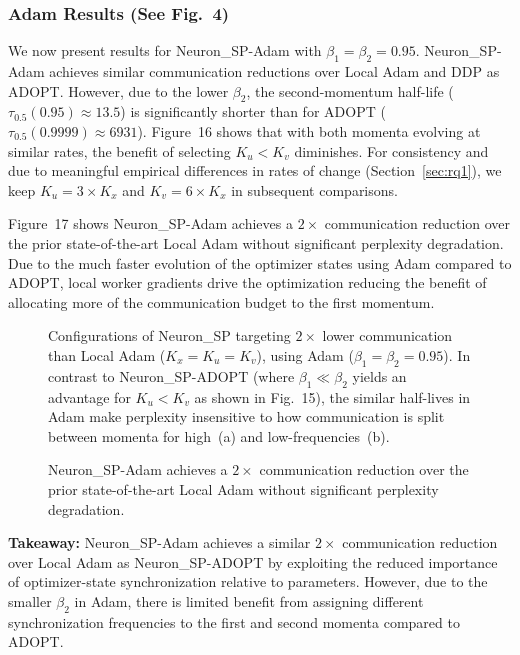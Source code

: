 \documentclass{article}
\begin{document}
\subsubsection{Adam Results (See Fig.~4)}
\label{sec:b34_adam_fig4}

We now present results for Neuron\_SP-Adam with $\beta_1=\beta_2=0.95$. Neuron\_SP-Adam achieves similar communication reductions over Local Adam and DDP as ADOPT. However, due to the lower $\beta_2$, the second-momentum half-life ($\tau_{0.5}(0.95)\approx 13.5$) is significantly shorter than for ADOPT ($\tau_{0.5}(0.9999)\approx 6931$). Figure~16 shows that with both momenta evolving at similar rates, the benefit of selecting $K_u < K_v$ diminishes. For consistency and due to meaningful empirical differences in rates of change (Section~\ref{sec:rq1}), we keep $K_u=3\times K_x$ and $K_v=6\times K_x$ in subsequent comparisons.

Figure~17 shows Neuron\_SP-Adam achieves a $2\times$ communication reduction over the prior state-of-the-art Local Adam \citep{Cheng2025} without significant perplexity degradation. Due to the much faster evolution of the optimizer states using Adam compared to ADOPT, local worker gradients drive the optimization reducing the benefit of allocating more of the communication budget to the first momentum.

\begin{figure}[ht]
\centering
\caption{Configurations of Neuron\_SP targeting $2\times$ lower communication than Local Adam ($K_x=K_u=K_v$), using Adam ($\beta_1=\beta_2=0.95$). In contrast to Neuron\_SP-ADOPT (where $\beta_1 \ll \beta_2$ yields an advantage for $K_u < K_v$ as shown in Fig.~15), the similar half-lives in Adam make perplexity insensitive to how communication is split between momenta for high~(a) and low-frequencies~(b).}
\label{fig:16}
\end{figure}

\begin{figure}[ht]
\centering
\caption{Neuron\_SP-Adam achieves a $2\times$ communication reduction over the prior state-of-the-art Local Adam without significant perplexity degradation.}
\label{fig:17}
\end{figure}

\textbf{Takeaway:} Neuron\_SP-Adam achieves a similar $2\times$ communication reduction over Local Adam as Neuron\_SP-ADOPT by exploiting the reduced importance of optimizer-state synchronization relative to parameters. However, due to the smaller $\beta_2$ in Adam, there is limited benefit from assigning different synchronization frequencies to the first and second momenta compared to ADOPT.
\end{document}
